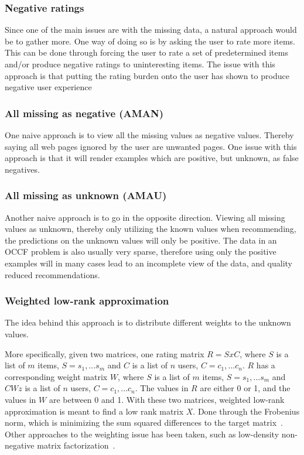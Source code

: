 \subsubsection{Negative ratings}
    Since one of the main issues are with the missing data, a natural approach
    would be to gather more.  One way of doing so is by asking the user to rate
    more items.  This can be done through forcing the user to rate a set of
    predetermined items and/or produce negative ratings to uninteresting items.
    The issue with this approach is that putting the rating burden onto the user
    has shown to produce negative user
    experience~\cite{Kelly:2003:IFI:959258.959260}

\subsubsection{All missing as negative (AMAN)}
    One naive approach is to view all the missing values as negative values.
    Thereby saying all web pages ignored by the user are unwanted pages.  One issue
    with this approach is that it will render examples which are positive, but
    unknown, as false negatives.

\subsubsection{All missing as unknown (AMAU)}
    Another naive approach is to go in the opposite direction.  Viewing all missing
    values as unknown, thereby only utilizing the known values when recommending,
    the predictions on the unknown values will only be positive.  The data in an
    OCCF problem is also usually very sparse, therefore using only the positive
    examples will in many cases lead to an incomplete view of the data, and quality
    reduced recommendations.

\subsubsection{Weighted low-rank approximation}
    \cite{pan2008} \cite{Nati03weightedlow-rank}
    The idea behind this approach is to distribute different weights to the unknown
    values.

    More specifically, given two matrices, one rating matrix $R = SxC$, where $S$
    is a list of $m$ items, $S = {s_{1},...s_{m}}$ and $C$ is a list of $n$ users,
    $C = {c_{1}, ... c_{n}}$.
    $R$ has a corresponding weight matrix $W$, where $S$ is a list of $m$ items, $S
    = {s_{1},...s_{m}}$ and $CWz$ is a list of $n$ users, $C = {c_{1}, ... c_{n}}$.
    The values in $R$ are either 0 or 1, and the values in $W$ are between 0 and 1.
    With these two matrices, weighted low-rank approximation is meant to find a low
    rank matrix $X$.  Done through the Frobenius norm, which is minimizing the sum
    squared differences to the target matrix~\cite{frobeniusNorm}.  Other
    approaches to the weighting issue has been taken, such as low-density
    non-negative matrix factorization~\cite{Sindhwani:2010:OMC:1933307.1934641}.

